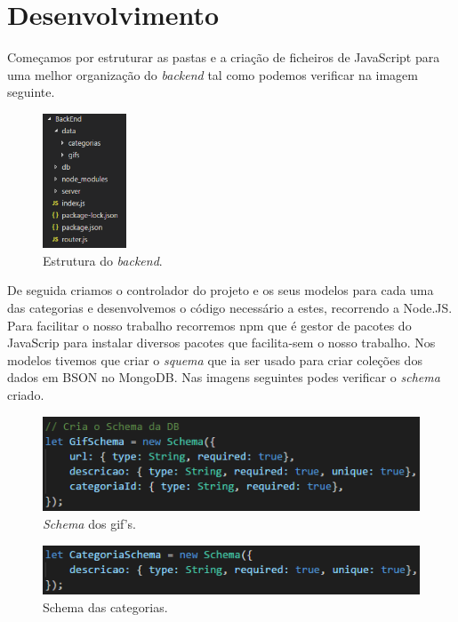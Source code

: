 \documentclass[11pt]{report}
\begin{document}
\chapter*{Desenvolvimento}


Começamos por estruturar as pastas e a criação de ficheiros de JavaScript para uma melhor organização do \textit{backend} tal como podemos verificar na imagem seguinte.

\begin{figure} [!h]
\centering
\includegraphics[width=25mm]{Prints_Trabalho/estrutura.png}
\caption{Estrutura do \textit{backend}.}
\label{Rotulo}
\end{figure}

De seguida criamos o controlador do projeto e os seus modelos para cada uma das categorias  e desenvolvemos o código necessário a estes, recorrendo a Node.JS. Para facilitar o nosso trabalho recorremos npm que é gestor de pacotes do JavaScrip  para instalar diversos pacotes que facilita-sem o nosso trabalho. Nos modelos tivemos que criar o \textit{squema} que ia ser usado para criar coleções dos dados em BSON no MongoDB. Nas imagens seguintes podes verificar o \textit{schema} criado.

\clearpage

\begin{figure} [h]
\centering
\includegraphics[width=\textwidth]{Prints_Trabalho/schemaGif.png}
\caption{\textit{Schema} dos gif's.}
\label{Rotulo}
\end{figure}

\begin{figure} [h]
\centering
\includegraphics[width=\textwidth]{Prints_Trabalho/schemaCategorias.png}
\caption{Schema das categorias.}
\label{Rotulo}
\end{figure}
\end{document}
